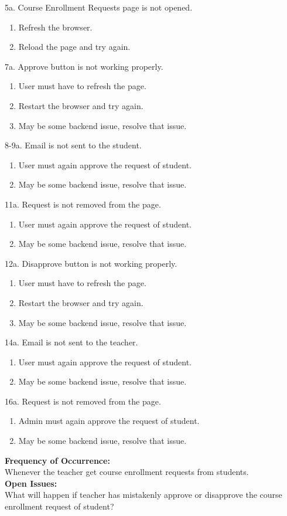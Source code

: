 5a. Course Enrollment Requests page is not opened.
\begin{enumerate}
\item Refresh the browser.
\item Reload the page and try again.
\end{enumerate}
7a. Approve button is not working properly.
\begin{enumerate}
\item User must have to refresh the page.
\item Restart the browser and try again.
\item May be some backend issue, resolve that issue.
\end{enumerate}
8-9a. Email is not sent to the student.
\begin{enumerate}
\item User must again approve the request of student.
\item May be some backend issue, resolve that issue.
\end{enumerate}
11a. Request is not removed from the page.
\begin{enumerate}
\item User must again approve the request of student.
\item May be some backend issue, resolve that issue.
\end{enumerate}
12a. Disapprove button is not working properly.
\begin{enumerate}
\item User must have to refresh the page.
\item Restart the browser and try again.
\item May be some backend issue, resolve that issue.
\end{enumerate}
14a. Email is not sent to the teacher.
\begin{enumerate}
\item User must again approve the request of student.
\item May be some backend issue, resolve that issue.
\end{enumerate}
16a. Request is not removed from the page.
\begin{enumerate}
\item Admin must again approve the request of student.
\item May be some backend issue, resolve that issue.
\end{enumerate}
\textbf{Frequency of Occurrence:}\\
Whenever the teacher get course enrollment requests from students.
\\
\textbf{Open Issues:}\\
What will happen if teacher has mistakenly approve or disapprove the course enrollment request of student?







